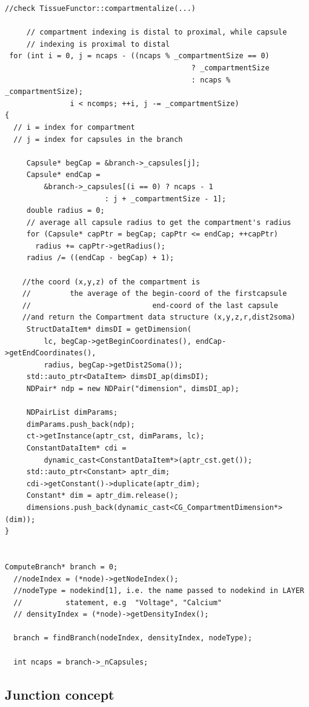 \begin{lstlisting}
//check TissueFunctor::compartmentalize(...)

     // compartment indexing is distal to proximal, while capsule
     // indexing is proximal to distal
 for (int i = 0, j = ncaps - ((ncaps % _compartmentSize == 0)
                                           ? _compartmentSize
                                           : ncaps % _compartmentSize);
               i < ncomps; ++i, j -= _compartmentSize)
{
  // i = index for compartment
  // j = index for capsules in the branch
  
     Capsule* begCap = &branch->_capsules[j];
     Capsule* endCap =
         &branch->_capsules[(i == 0) ? ncaps - 1
                       : j + _compartmentSize - 1];
     double radius = 0;
     // average all capsule radius to get the compartment's radius
     for (Capsule* capPtr = begCap; capPtr <= endCap; ++capPtr)
       radius += capPtr->getRadius();
     radius /= ((endCap - begCap) + 1);
	
	//the coord (x,y,z) of the compartment is 
	//         the average of the begin-coord of the firstcapsule 
	//                            end-coord of the last capsule
	//and return the Compartment data structure (x,y,z,r,dist2soma)
     StructDataItem* dimsDI = getDimension(
         lc, begCap->getBeginCoordinates(), endCap->getEndCoordinates(),
         radius, begCap->getDist2Soma());
     std::auto_ptr<DataItem> dimsDI_ap(dimsDI);
     NDPair* ndp = new NDPair("dimension", dimsDI_ap);

     NDPairList dimParams;
     dimParams.push_back(ndp);
     ct->getInstance(aptr_cst, dimParams, lc);
     ConstantDataItem* cdi =
         dynamic_cast<ConstantDataItem*>(aptr_cst.get());
     std::auto_ptr<Constant> aptr_dim;
     cdi->getConstant()->duplicate(aptr_dim);
     Constant* dim = aptr_dim.release();
     dimensions.push_back(dynamic_cast<CG_CompartmentDimension*>(dim));
}


ComputeBranch* branch = 0;
  //nodeIndex = (*node)->getNodeIndex();
  //nodeType = nodekind[1], i.e. the name passed to nodekind in LAYER
  //          statement, e.g  "Voltage", "Calcium" 
  // densityIndex = (*node)->getDensityIndex();
  
  branch = findBranch(nodeIndex, densityIndex, nodeType);

  int ncaps = branch->_nCapsules;
\end{lstlisting}



\subsection{Junction concept}
\label{sec:junction-in-NTS}

